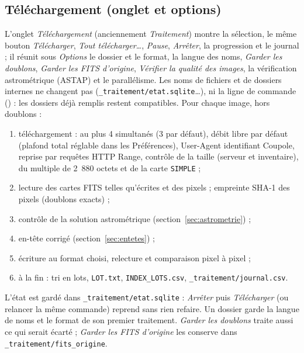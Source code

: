 \subsection{Téléchargement (onglet et options)}
L'onglet \emph{Téléchargement} (anciennement \emph{Traitement}) montre la sélection, le même bouton
\emph{Télécharger}, \emph{Tout télécharger…}, \emph{Pause}, \emph{Arrêter}, la progression et le journal ; il réunit
sous \emph{Options} le dossier et le format, la langue des noms, \emph{Garder les doublons}, \emph{Garder les FITS
d'origine}, \emph{Vérifier la qualité des images}, la vérification astrométrique (ASTAP) et le parallélisme. Les noms
de fichiers et de dossiers internes ne changent pas (\texttt{\_traitement/etat.sqlite}…), ni la ligne de commande
() : les dossiers déjà remplis restent compatibles.
Pour chaque image, hors doublons :
\begin{enumerate}[leftmargin=*,itemsep=1pt]
\item téléchargement : au plus 4 simultanés (3 par défaut), débit libre par défaut (plafond total réglable dans les Préférences), User-Agent
  identifiant Coupole, reprise par requêtes HTTP Range, contrôle de la taille (serveur et inventaire), du multiple
  de 2~880 octets et de la carte \texttt{SIMPLE} ;
\item lecture des cartes FITS telles qu'écrites et des pixels ; empreinte SHA-1 des pixels (doublons exacts) ;
\item contrôle de la solution astrométrique (section~\ref{sec:astrometrie}) ;
\item en-tête corrigé (section~\ref{sec:entetes}) ;
\item écriture au format choisi, relecture et comparaison pixel à pixel ;
\item à la fin : tri en lots, \texttt{LOT.txt}, \texttt{INDEX\_LOTS.csv}, \texttt{\_traitement/journal.csv}.
\end{enumerate}
L'état est gardé dans \texttt{\_traitement/etat.sqlite} : \emph{Arrêter} puis \emph{Télécharger} (ou relancer la même
commande) reprend sans rien refaire. Un dossier garde la langue de noms et le format de son premier traitement.
\emph{Garder les doublons} traite aussi ce qui serait écarté ; \emph{Garder les FITS d'origine} les conserve dans
\texttt{\_traitement/fits\_origine}.


